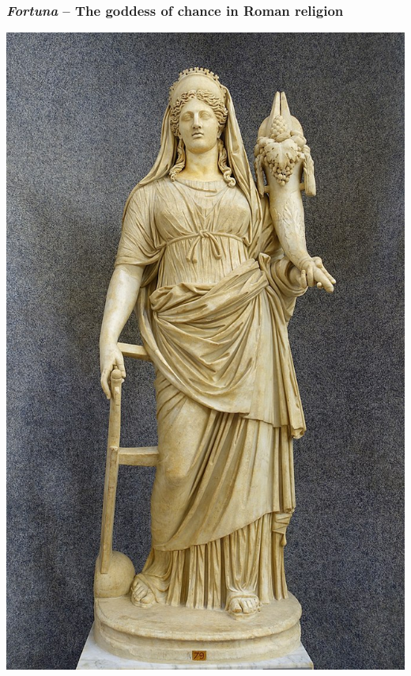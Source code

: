 \documentclass[9pt]{beamer}
\begin{document}
\begin{frame}[fragile] %
  \frametitle{{\it Fortuna} -- The goddess of chance in Roman religion}
  \begin{center}
    \includegraphics[scale=0.172]{./figs/Fortuna.jpg} \quad

\end{center}
\end{frame}
\end{document}
